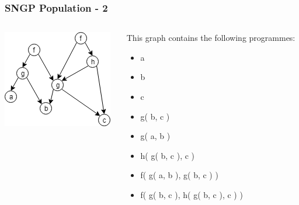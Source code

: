 \documentclass{beamer}
\begin{document}
		\begin{frame}
			\frametitle{SNGP Population - 2}
			
			\begin{columns}
				
				\begin{column}{0.4\textwidth}
					
					\includegraphics[scale=0.7]{resources/9_sngp_graph_no_array}
					
				\end{column}
			
				\begin{column}{0.6\textwidth}
					
					This graph contains the following programmes:
					
					\begin{itemize}
						\item a
						\item b
						\item c
						\item g( b, c )
						\item g( a, b )
						\item h( g( b, c ), c )
						\item f( g( a, b ), g( b, c ) )
						\item f( g( b, c ), h( g( b, c ), c ) )
					\end{itemize}
					
				\end{column}
				
			\end{columns}
			
		\end{frame}
	
\end{document}
